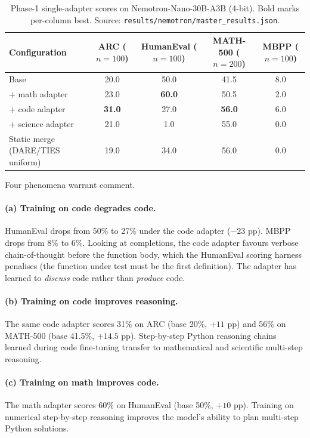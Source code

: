 \documentclass{article}
\begin{document}
\begin{table}[h]
  \caption{Phase-1 single-adapter scores on Nemotron-Nano-30B-A3B (4-bit). Bold marks per-column best. Source: \texttt{results/nemotron/master\_results.json}.}
  \label{tab:phase1}
  \centering
  \begin{tabular}{lcccc}
    \toprule
    Configuration & ARC ($n{=}100$) & HumanEval ($n{=}100$) & MATH-500 ($n{=}200$) & MBPP ($n{=}100$) \\
    \midrule
    Base & 20.0 & 50.0 & 41.5 & 8.0 \\
    + math adapter & 23.0 & \textbf{60.0} & 50.5 & 2.0 \\
    + code adapter & \textbf{31.0} & 27.0 & \textbf{56.0} & 6.0 \\
    + science adapter & 21.0 & 1.0 & 55.0 & 0.0 \\
    Static merge (DARE/TIES uniform) & 19.0 & 34.0 & 56.0 & 0.0 \\
    \bottomrule
  \end{tabular}
\end{table}

Four phenomena warrant comment.

\paragraph{(a) Training on code degrades code.} HumanEval drops from 50\% to 27\% under the code adapter ($-23$ pp). MBPP drops from 8\% to 6\%. Looking at completions, the code adapter favours verbose chain-of-thought before the function body, which the HumanEval scoring harness penalises (the function under test must be the first definition). The adapter has learned to \emph{discuss} code rather than \emph{produce} code.

\paragraph{(b) Training on code improves reasoning.} The same code adapter scores 31\% on ARC (base 20\%, $+11$ pp) and 56\% on MATH-500 (base 41.5\%, $+14.5$ pp). Step-by-step Python reasoning chains learned during code fine-tuning transfer to mathematical and scientific multi-step reasoning.

\paragraph{(c) Training on math improves code.} The math adapter scores 60\% on HumanEval (base 50\%, $+10$ pp). Training on numerical step-by-step reasoning improves the model's ability to plan multi-step Python solutions.
\end{document}
